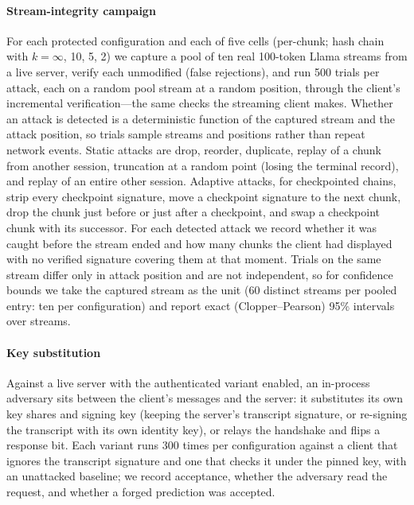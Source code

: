 \documentclass[conference]{IEEEtran}
\begin{document}
\paragraph*{Stream-integrity campaign} For each protected configuration and each of five cells
(per-chunk; hash chain with $k=\infty$, 10, 5, 2) we capture a pool of ten real 100-token Llama streams
from a live server, verify each unmodified (false rejections), and run 500 trials per attack, each on a
random pool stream at a random position, through the client's incremental verification---the same checks
the streaming client makes. Whether an attack is detected is a deterministic function of the captured
stream and the attack position, so trials sample streams and positions rather than repeat network
events. Static attacks are drop, reorder, duplicate, replay of a chunk from another session, truncation
at a random point (losing the terminal record), and replay of an entire other session. Adaptive attacks,
for checkpointed chains, strip every checkpoint signature, move a checkpoint signature to the next chunk,
drop the chunk just before or just after a checkpoint, and swap a checkpoint chunk with its successor.
For each detected attack we record whether it was caught before the stream ended and how many chunks
the client had displayed with no verified signature covering them at that moment. Trials on the same
stream differ only in attack position and are not independent, so for confidence bounds we take the
captured stream as the unit (60 distinct streams per pooled entry: ten per configuration) and report
exact (Clopper--Pearson) 95\% intervals over streams.

\paragraph*{Key substitution} Against a live server with the authenticated variant enabled, an
in-process adversary sits between the client's messages and the server: it substitutes its own key
shares and signing key (keeping the server's transcript signature, or re-signing the transcript with its
own identity key), or relays the handshake and flips a response bit. Each variant runs 300 times per
configuration against a client that ignores the transcript signature and one that checks it under the
pinned key, with an unattacked baseline; we record acceptance, whether the adversary read the request,
and whether a forged prediction was accepted.
\end{document}
